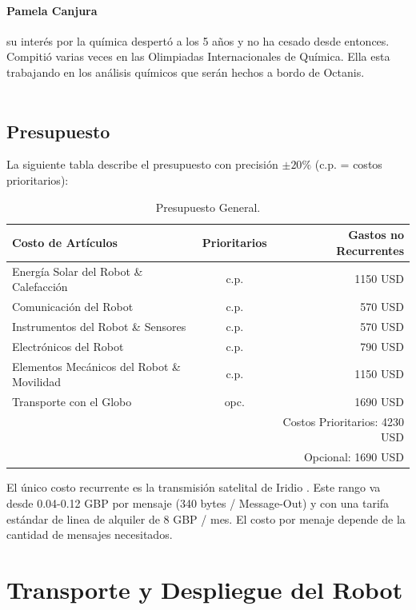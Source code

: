 \documentclass[a4paper,12pt]{article}
\begin{document}
\paragraph{Pamela Canjura}  su interés por la química despertó a los 5 años y no ha cesado desde entonces. Compitió varias veces en las Olimpiadas Internacionales de Química. Ella esta trabajando en los análisis químicos que serán hechos a bordo de Octanis.
\\ \\


\subsection{Presupuesto}

La siguiente tabla describe el presupuesto con precisión $\pm 20\%$ (c.p. = costos prioritarios): \\ 

\begin{table}[h!]
\centering
\begin{tabular}{ l | c || r }
  Costo de Artículos & Prioritarios & Gastos no Recurrentes \\
  \hline
  Energía Solar del Robot \& Calefacción & c.p. & 1150 USD \\
  Comunicación del Robot & c.p. & 570 USD \\
  Instrumentos del Robot \& Sensores & c.p. & 570 USD \\
  Electrónicos del Robot & c.p. & 790 USD \\
  Elementos Mecánicos del Robot \& Movilidad & c.p. & 1150 USD \\
  Transporte con el Globo & opc. & 1690 USD \\
  \hline \hline
  & & Costos Prioritarios: 4230 USD  \\
  & & Opcional: 1690 USD \\
\end{tabular}
\caption{Presupuesto General.}
\end{table}


El único costo recurrente es la transmisión satelital de Iridio \cite{iridium}. Este rango va desde 0.04-0.12 GBP por mensaje (340 bytes / Message-Out) y con una tarifa estándar de linea de alquiler de 8 GBP / mes. El costo por menaje depende de la cantidad de mensajes necesitados.



\section{Transporte y Despliegue del Robot}
\end{document}
